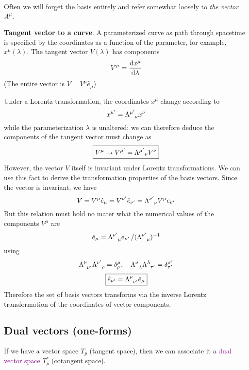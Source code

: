 Often we will forget the basis entirely and refer somewhat loosely to \textit{the vector $A^\mu$}.

\begin{example}
    \textbf{Tangent vector to a curve}.
    A parameterized curve as path through spacetime is specified by the coordinates as a function of the parameter, for example, $x^\mu(\lambda)$. The tangent vector $V(\lambda)$ has components
    \begin{equation*}
        V^\mu=\dv{x^\mu}{\lambda}
    \end{equation*}
    (The entire vector is $V=V^\mu\hat{e}_\mu$)
\end{example}
Under a Lorentz transformation, the coordinates $x^\mu$ change according to
$$x^{\mu'}=\tensor{\Lambda}{^{\mu'}_\nu}x^\nu$$
while the parameterization $\lambda$ is unaltered; we can therefore deduce the components of the tangent vector must change as
\begin{equation}
    \boxed{V^\mu\to V^{\mu'}=\tensor{\Lambda}{^{\mu'}}_\nu V^\nu}
\end{equation}
However, the vector $V$ itself is invariant under Lorentz transformations. We can use this fact to derive the transformation properties of the basis vectors. Since the vector is invariant, we have
\begin{equation*}
    V=V^\mu\hat{e}_\mu=V^{\nu'}\hat{e}_{\nu'}=\tensor{\Lambda}{^{\nu'}_{\nu}}V^\mu e_{\nu'}
\end{equation*}
But this relation must hold no mater what the numerical values of the components $V^\mu$ are
\begin{equation*}
    \hat{e}_\mu=\tensor{\Lambda}{^{\nu'}_\mu}e_{\nu'}\, /(\tensor{\Lambda}{^{\nu'}_\mu})^{-1}
\end{equation*}
using
\begin{equation*}
    \tensor{\Lambda}{^\mu_{\nu'}}\tensor{\Lambda}{^{\nu'}_{\rho}}=\delta^\mu_\rho,\quad \tensor{\Lambda}{^{\sigma}_{\lambda}}\tensor{\Lambda}{^\lambda_{\tau'}}=\delta^{\sigma'}_{\tau'}
\end{equation*}
\begin{equation}
    \boxed{\hat{e}_{\nu'}=\tensor{\Lambda}{^\mu_{\nu'}}\hat{e}_\mu}
\end{equation}
Therefore the set of basis vectors transforms via the inverse Lorentz transformation of the coordinates of vector components.

\subsection{Dual vectors (one-forms)}
If we have a vector space $T_p$ (tangent space), then we can associate it a \textcolor{purple}{dual vector space} $T_p^*$ (cotangent space).

